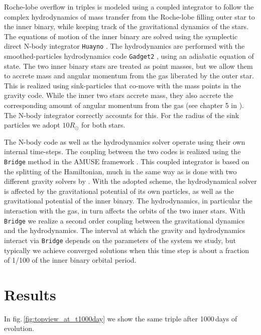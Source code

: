 \documentclass{aastex62}
\begin{document}
{Roche-lobe overflow in triples is modeled using a coupled integrator
to follow the complex hydrodynamics of mass transfer from the
Roche-lobe filling outer star to the inner binary, while keeping track
of the gravitational dynamics of the stars.  The equations of motion
of the inner binary are solved using the symplectic direct N-body
integrator \texttt{Huayno} \citep{2012NewA...17..711P}. The
hydrodynamics are performed with the smoothed-particles hydrodynamics
code \texttt{Gadget2} \citep{2000ascl.soft03001S}, using an adiabatic
equation of state.  The two inner binary stars are treated as point
masses, but we allow them to accrete mass and angular momentum from
the gas liberated by the outer star.  This is realized using
sink-particles that co-move with the mass points in the gravity
code. While the inner two stars accrete mass, they also accrete the
corresponding amount of angular momentum from the gas (see chapter 5
in \cite{AMUSE}).  The N-body integrator correctly accounts for this.  For the radius of the sink particles we adopt $10
R_\odot$ for both stars.

The N-body code as well as the hydrodynamics solver operate using
their own internal time-steps. The coupling between the two codes is
realized using the \texttt{Bridge} method in the AMUSE framework
\citep[see Sect.\.4.3.1 in][]{2013CoPhC.183..456P}.  This coupled
integrator is based on the splitting of the Hamiltonian, much in the
same way as is done with two different gravity solvers by
\cite{2007PASJ...59.1095F}. With the adopted scheme, the
hydrodynamical solver is affected by the gravitational potential of
its own particles, as well as the gravitational potential of the inner
binary. The hydrodynamics, in particular the interaction with the gas,
in turn affects the orbits of the two inner stars. With
\texttt{Bridge} we realize a second order coupling between the
gravitational dynamics and the hydrodynamics.  The interval at which
the gravity and hydrodynamics interact via \texttt{Bridge} depends on
the parameters of the system we study, but typically we achieve
converged solutions when this time step is about a fraction of 1/100
of the inner binary orbital period.

\section{Results} \label{results}

In fig.\,\ref{fig:topview_at_t1000day} we show the same triple after
1000\,days of evolution.

}
\end{document}

